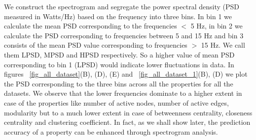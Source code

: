 We construct the spectrogram and segregate the power spectral density (PSD measured in Watts/Hz) based on the frequency into three bins. In bin 1 we calculate the mean PSD 
corresponding to the frequencies $<$ 5 Hz, in bin 2 we calculate the PSD corresponding to frequencies between 5 and 15 Hz and bin 3 consists of the 
mean PSD value corresponding to frequencies $>$ 15 Hz. We call them LPSD, MPSD and HPSD respectively.
So a higher value of mean PSD corresponding to bin 1 (LPSD) would indicate lower fluctuations in data. 
In figures ~\ref{fig_all_dataset}(B), (D), (E) and ~\ref{fig_all_dataset_1}(B), (D) we plot the PSD corresponding to the three bins across all the properties for all the datasets. We 
observe that the lower frequencies dominate to a higher extent in case of the properties like number of active nodes, number of active edges, modularity 
but to a much lower extent in case of betweenness centrality, closeness centrality and clustering coefficient.  
In fact, as we shall show later, the prediction accuracy of a property can be enhanced through spectrogram analysis.



% 

